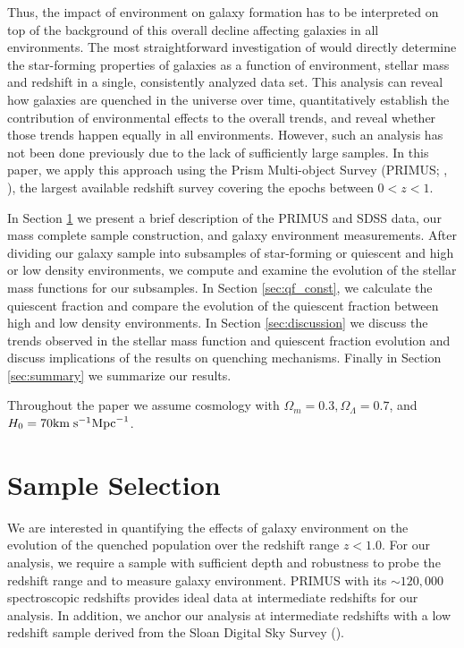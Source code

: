 \documentclass{emulateapj}
\begin{document}
Thus, the impact of environment on galaxy formation has to be
interpreted on top of the background of this overall decline affecting
galaxies in all environments.  The most straightforward investigation
of would directly determine the star-forming properties of galaxies as
a function of environment, stellar mass and redshift in a single,
consistently analyzed data set. This analysis can reveal how galaxies
are quenched in the universe over time, quantitatively establish the
contribution of environmental effects to the overall trends, and
reveal whether those trends happen equally in all environments.
However, such an analysis has not been done previously due to the lack
of sufficiently large samples. In this paper, we apply this approach
using the Prism Multi-object Survey (PRIMUS; \cite{Coil:2011aa}, 
\cite{Cool:2013aa}), the largest available redshift survey covering the epochs
between $0<z<1$.

In Section \ref{sec:sample} we present a brief description of the PRIMUS and SDSS data, our mass complete sample construction, and galaxy environment measurements. After dividing our galaxy sample into subsamples of star-forming or quiescent and high or low density environments, we compute and examine the evolution of the stellar mass functions for our subsamples. In Section \ref{sec:qf_const}, we calculate the quiescent fraction and compare the evolution of the quiescent fraction between high and low density environments. In Section \ref{sec:discussion} we discuss the trends observed in the stellar mass function and quiescent fraction evolution and discuss implications of the results on quenching mechanisms. Finally in Section \ref{sec:summary} we summarize our results. 

Throughout the paper we assume cosmology with $\Omega_{m} = 0.3, \Omega_{\Lambda} = 0.7$, and $H_0 = 70 \rm{km} \; \rm{s}^{-1} \rm{Mpc}^{-1}$.
\section{Sample Selection} \label{sec:sample}
We are interested in quantifying the effects of galaxy environment on the evolution of the quenched population over the redshift range $z < 1.0$. For our analysis, we require a sample with sufficient depth and robustness to probe the redshift range and to measure galaxy environment. PRIMUS with its $\sim 120,000$ spectroscopic redshifts provides ideal data at intermediate redshifts for our analysis. In addition, we anchor our analysis at intermediate redshifts with a low redshift sample derived from the Sloan Digital Sky Survey (\cite{York:2000aa}). 
\end{document}
